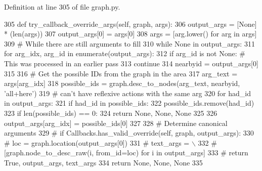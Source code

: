 Definition at line 305 of file graph.\+py.


\begin{DoxyCode}
305     \textcolor{keyword}{def }try\_callback\_override\_args(self, graph, args):
306         output\_args = [\textcolor{keywordtype}{None}] * (len(args))
307         output\_args[0] = args[0]
308         args = [arg.lower() \textcolor{keywordflow}{for} arg \textcolor{keywordflow}{in} args]
309         \textcolor{comment}{# While there are still arguments to fill}
310         \textcolor{keywordflow}{while} \textcolor{keywordtype}{None} \textcolor{keywordflow}{in} output\_args:
311             \textcolor{keywordflow}{for} arg\_idx, arg\_id \textcolor{keywordflow}{in} enumerate(output\_args):
312                 \textcolor{keywordflow}{if} arg\_id \textcolor{keywordflow}{is} \textcolor{keywordflow}{not} \textcolor{keywordtype}{None}:  \textcolor{comment}{# This was processed in an earlier pass}
313                     \textcolor{keywordflow}{continue}
314                 nearbyid = output\_args[0]
315 
316                 \textcolor{comment}{# Get the possible IDs from the graph in the area}
317                 arg\_text = args[arg\_idx]
318                 possible\_ids = graph.desc\_to\_nodes(arg\_text, nearbyid, \textcolor{stringliteral}{'all+here'})
319                 \textcolor{comment}{# can't have reflexive actions with the same arg}
320                 \textcolor{keywordflow}{for} had\_id \textcolor{keywordflow}{in} output\_args:
321                     \textcolor{keywordflow}{if} had\_id \textcolor{keywordflow}{in} possible\_ids:
322                         possible\_ids.remove(had\_id)
323                 \textcolor{keywordflow}{if} len(possible\_ids) == 0:
324                     \textcolor{keywordflow}{return} \textcolor{keywordtype}{None}, \textcolor{keywordtype}{None}, \textcolor{keywordtype}{None}
325 
326                 output\_args[arg\_idx] = possible\_ids[0]
327 
328         \textcolor{comment}{# Determine canonical arguments}
329         \textcolor{comment}{# if Callbacks.has\_valid\_override(self, graph, output\_args):}
330         \textcolor{comment}{#     loc = graph.location(output\_args[0])}
331         \textcolor{comment}{#     text\_args = \(\backslash\)}
332         \textcolor{comment}{#         [graph.node\_to\_desc\_raw(i, from\_id=loc) for i in output\_args]}
333         \textcolor{comment}{#     return True, output\_args, text\_args}
334         \textcolor{keywordflow}{return} \textcolor{keywordtype}{None}, \textcolor{keywordtype}{None}, \textcolor{keywordtype}{None}
335 
\end{DoxyCode}
\mbox{\label{classlight__chats_1_1graph_1_1GraphFunction_a8ac297dcadb1e5ec360f55f293dcbfcb}} 
